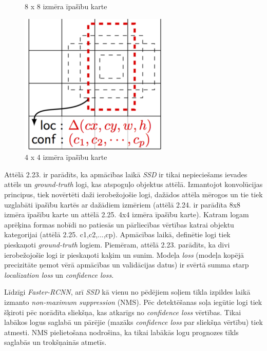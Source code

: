\begin{figure}[!htb]
	\caption{8 x 8 izmēra īpašību karte \cite{liu2016ssd}}
	\endminipage\hfill
	\includegraphics[width=\linewidth]{images/ssd44featmap.png}
	\caption{4 x 4 izmēra īpašību karte \cite{liu2016ssd}}
	\endminipage
\end{figure}

Attēlā 2.23. ir parādīts, ka apmācības laikā \textit{SSD} ir tikai nepieciešams ievades attēls un \textit{ground-truth} logi, kas atspoguļo objektus attēlā. Izmantojot konvolūcijas principus, tiek novērtēti daži ierobežojošie logi, dažādos attēla mērogos un tie tiek uzglabāti īpašību kartēs ar dažādiem izmēriem (attēlā 2.24. ir parādīta 8x8 izmēra īpašību karte un attēlā 2.25. 4x4 izmēra īpašību karte). Katram logam aprēķina formas nobīdi no patiesās un pārliecības vērtības katrai objektu kategorijai (attēlā 2.25. c1,c2,...,cp). Apmācības laikā, definētie logi tiek pieskaņoti \textit{ground-truth} logiem. Piemēram, attēlā 2.23. parādīts, ka divi ierobežojošie logi ir pieskaņoti kaķim un sunim. Modeļa \textit{loss} (modeļa kopējā precizitāte ņemot vērā apmācības un validācijas datus) ir svērtā summa starp \textit{localization loss} un \textit{confidence loss}. 

Līdzīgi \textit{Faster-RCNN}, arī \textit{SSD} kā vienu no pēdējiem soļiem tīkla izpildes laikā izmanto \textit{non-maximum suppression} (NMS). Pēc detektēšanas soļa iegūtie logi tiek šķiroti pēc norādīta sliekšņa, kas atkarīgs no \textit{confidence loss} vērtības. Tikai labākos logus saglabā un pārējie (mazāks \textit{confidence loss} par sliekšņa vērtību) tiek atmesti. NMS pielietošana nodrošina, ka tikai labākās logu prognozes tīkls saglabās un trokšņainās atmetīs.

